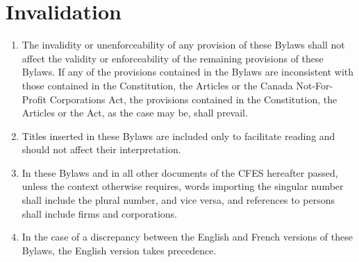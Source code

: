 \section{Invalidation}
\label{invalidation}

\begin{enumerate}
 \item The invalidity or unenforceability of any provision of these Bylaws shall not affect the validity or enforceability of the remaining provisions of these Bylaws. If any of the provisions contained in the Bylaws are inconsistent with those contained in the Constitution, the Articles or the Canada Not-For-Profit Corporations Act, the provisions contained in the Constitution, the Articles or the Act, as the case may be, shall prevail.
 \item Titles inserted in these Bylaws are included only to facilitate reading and should not affect their interpretation.
 \item In these Bylaws and in all other documents of the CFES hereafter passed, unless the context otherwise requires, words importing the singular number shall include the plural number, and vice versa, and references to persons shall include firms and corporations.
 \item In the case of a discrepancy between the English and French versions of these Bylaws, the English version takes precedence.
\end{enumerate}
